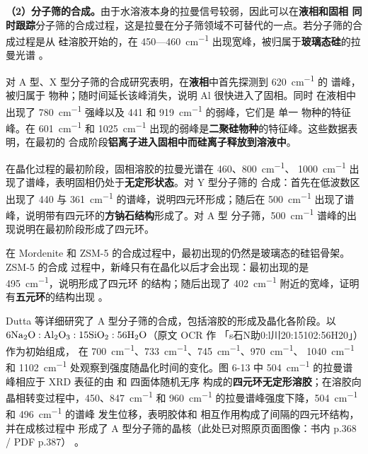\textbf{（2）分子筛的合成。}由于水溶液本身的拉曼信号较弱，因此可以在\textbf{液相和固相
同时跟踪}分子筛的合成过程，这是拉曼在分子筛领域不可替代的一点。若分子筛的合成过程是从
硅溶胶开始的，在 450—\qty{460}{cm^{-1}} 出现宽峰，被归属于\textbf{玻璃态硅}的拉曼光谱
。

对 A 型、X 型分子筛的合成研究表明，在\textbf{液相}中首先探测到 \qty{620}{cm^{-1}} 的
谱峰，被归属于  物种；随时间延长该峰消失，说明 Al 很快进入了固相。同时
在液相中出现了 \qty{780}{cm^{-1}} 强峰以及 441 和 \qty{919}{cm^{-1}} 的弱峰，它们是
单一  物种的特征峰。在 \qty{601}{cm^{-1}} 和
\qty{1025}{cm^{-1}} 出现的弱峰是\textbf{二聚硅物种}的特征峰。这些数据表明，在最初的
合成阶段\textbf{铝离子进入固相中而硅离子释放到溶液中}。

在晶化过程的最初阶段，固相溶胶的拉曼光谱在 460、\qty{800}{cm^{-1}}、
\qty{1000}{cm^{-1}} 出现了谱峰，表明固相仍处于\textbf{无定形状态}。对 Y 型分子筛的
合成：首先在低波数区出现了 440 与 \qty{361}{cm^{-1}} 的谱峰，说明四元环形成；随后在
\qty{500}{cm^{-1}} 出现了谱峰，说明带有四元环的\textbf{方钠石结构}形成了。对 A 型
分子筛，\qty{500}{cm^{-1}} 谱峰的出现说明在最初阶段形成了四元环。

在 Mordenite 和 ZSM-5 的合成过程中，最初出现的仍然是玻璃态的硅铝骨架。ZSM-5 的合成
过程中，新峰只有在晶化以后才会出现：最初出现的是 \qty{495}{cm^{-1}}，说明形成了四元环
的结构；随后出现了 \qty{402}{cm^{-1}} 附近的宽峰，证明有\textbf{五元环}的结构出现
。

Dutta 等详细研究了 A 型分子筛的合成，包括溶胶的形成及晶化各阶段。以
$6\ce{Na2O}:\ce{Al2O3}:15\ce{SiO2}:56\ce{H2O}$（原文 OCR 作
「s石N助0:l川20:15102:56H20」）作为初始组成，
在 \qty{700}{cm^{-1}}、\qty{733}{cm^{-1}}、\qty{745}{cm^{-1}}、\qty{970}{cm^{-1}}、
\qty{1040}{cm^{-1}} 和 \qty{1102}{cm^{-1}} 处观察到强度随晶化时间的变化。图 6-13 中
\qty{504}{cm^{-1}} 的拉曼谱峰相应于 XRD 表征的由  和  四面体随机无序
构成的\textbf{四元环无定形溶胶}；在溶胶向晶相转变过程中，450、\qty{847}{cm^{-1}} 和
\qty{960}{cm^{-1}} 的拉曼谱峰强度下降，\qty{504}{cm^{-1}} 和 \qty{496}{cm^{-1}} 的谱峰
发生位移，表明胶体和  相互作用构成了间隔的四元环结构，并在成核过程中
形成了 A 型分子筛的晶核（此处已对照原页面图像：书内 p.368 / PDF p.387）
。

